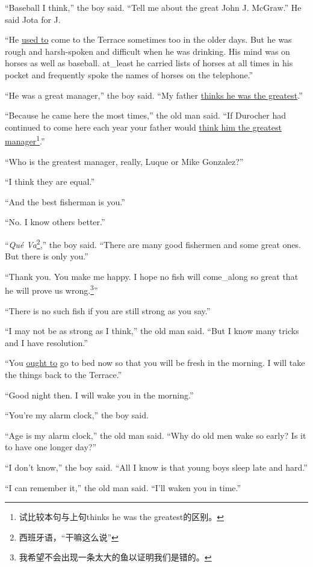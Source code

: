 \documentclass[fontset=ubuntu]{ctexrep}
\begin{document}
``Baseball I think,'' the boy said. ``Tell me about the great John J. McGraw.'' He said Jota for J.

``He \uline{used to} come to the Terrace sometimes too in the older days. But
he was \gls{rough} and \gls{harsh}-\gls{spoken} and difficult when he was
drinking. His mind was on \glspl{horse} as well as baseball. \Gls{at_least}
he carried lists of horses at all times in his pocket and \gls{frequently}
spoke the names of horses on the telephone.''

``He was a great manager,'' the boy said. ``My father \uline{thinks he was the greatest}.''

``Because he came here the most times,'' the old man said. ``If Durocher had
continued to come here each year your father would \uline{think him the
  greatest manager}\footnote{试比较本句与上句thinks he was the greatest的区别。}.''

``Who is the greatest manager, really, Luque or Mike Gonzalez?''

``I think they are \gls{equal}.''

``And the best fisherman is you.''

``No. I know others better.''

``\emph{Qué Va}\footnote{西班牙语，“干嘛这么说”},'' the boy said. ``There are
many good fishermen and some great ones. But there is only you.''

``Thank you. You make me happy. I hope no fish will \gls{come_along} so great that
he will prove us wrong.\footnote{我希望不会出现一条太大的鱼以证明我们是错的。}''

``There is no such fish if you are still strong as you say.''

``I may not be as strong as I think,'' the old man said. ``But I know many tricks and I have \gls{resolution}.''

``You \uline{ought to} go to bed now so that you will be \gls{fresh} in the
morning. I will take the things back to the Terrace.''

``Good night then. I will wake you in the morning.''

``You're my alarm clock,'' the boy said.

``Age is my alarm clock,'' the old man said. ``Why do old men wake so early? Is it to have one longer day?''

``I don't know,'' the boy said. ``All I know is that young boys sleep late and hard.''

``I can remember it,'' the old man said. ``I'll \gls{waken} you in time.''
\end{document}

